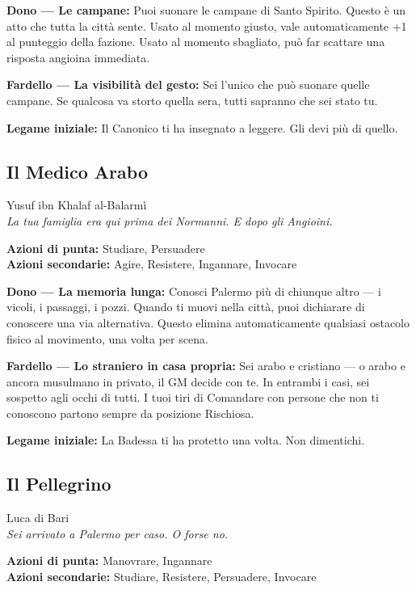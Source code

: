 \textbf{Dono — Le campane:} Puoi suonare le campane di Santo Spirito.
Questo è un atto che tutta la città sente. Usato al momento giusto,
vale automaticamente +1 al punteggio della fazione. Usato al momento
sbagliato, può far scattare una risposta angioina immediata.

\textbf{Fardello — La visibilità del gesto:} Sei l'unico che può
suonare quelle campane. Se qualcosa va storto quella sera, tutti
sapranno che sei stato tu.

\textbf{Legame iniziale:} Il Canonico ti ha insegnato a leggere.
Gli devi più di quello.

\filetto

\subsection{Il Medico Arabo}
{\cinzel\footnotesize\color{grigionote} Yusuf ibn Khalaf al-Balarmì}\\
\textit{La tua famiglia era qui prima dei Normanni. E dopo gli Angioini.}

\textbf{Azioni di punta:} Studiare, Persuadere\\
\textbf{Azioni secondarie:} Agire, Resistere, Ingannare, Invocare

\textbf{Dono — La memoria lunga:} Conosci Palermo più di chiunque
altro — i vicoli, i passaggi, i pozzi. Quando ti muovi nella città,
puoi dichiarare di conoscere una via alternativa. Questo elimina
automaticamente qualsiasi ostacolo fisico al movimento, una volta
per scena.

\textbf{Fardello — Lo straniero in casa propria:} Sei arabo e
cristiano — o arabo e ancora musulmano in privato, il GM decide
con te. In entrambi i casi, sei sospetto agli occhi di tutti.
I tuoi tiri di Comandare con persone che non ti conoscono partono
sempre da posizione Rischiosa.

\textbf{Legame iniziale:} La Badessa ti ha protetto una volta.
Non dimentichi.

\filetto

\subsection{Il Pellegrino}
{\cinzel\footnotesize\color{grigionote} Luca di Bari}\\
\textit{Sei arrivato a Palermo per caso. O forse no.}

\textbf{Azioni di punta:} Manovrare, Ingannare\\
\textbf{Azioni secondarie:} Studiare, Resistere, Persuadere, Invocare

